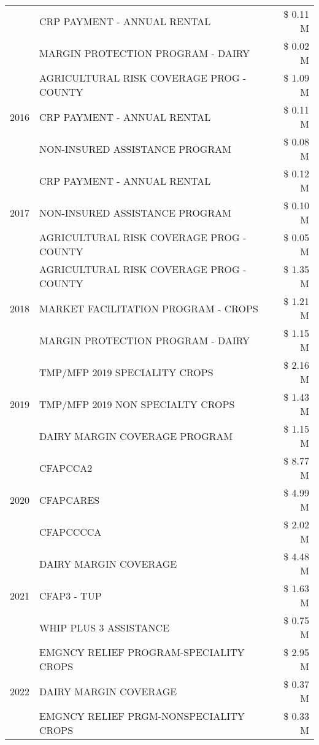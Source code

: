 \begin{tabular}{llr}
 & CRP PAYMENT - ANNUAL RENTAL & \$ 0.11 M \\
 & MARGIN PROTECTION PROGRAM - DAIRY & \$ 0.02 M \\
\cline{1-3}
\multirow[t]{3}{*}{2016} & AGRICULTURAL RISK COVERAGE PROG - COUNTY & \$ 1.09 M \\
 & CRP PAYMENT - ANNUAL RENTAL & \$ 0.11 M \\
 & NON-INSURED ASSISTANCE PROGRAM & \$ 0.08 M \\
\cline{1-3}
\multirow[t]{3}{*}{2017} & CRP PAYMENT - ANNUAL RENTAL & \$ 0.12 M \\
 & NON-INSURED ASSISTANCE PROGRAM & \$ 0.10 M \\
 & AGRICULTURAL RISK COVERAGE PROG - COUNTY & \$ 0.05 M \\
\cline{1-3}
\multirow[t]{3}{*}{2018} & AGRICULTURAL RISK COVERAGE PROG - COUNTY & \$ 1.35 M \\
 & MARKET FACILITATION PROGRAM - CROPS & \$ 1.21 M \\
 & MARGIN PROTECTION PROGRAM - DAIRY & \$ 1.15 M \\
\cline{1-3}
\multirow[t]{3}{*}{2019} & TMP/MFP 2019 SPECIALITY CROPS & \$ 2.16 M \\
 & TMP/MFP 2019 NON SPECIALTY CROPS & \$ 1.43 M \\
 & DAIRY MARGIN COVERAGE PROGRAM & \$ 1.15 M \\
\cline{1-3}
\multirow[t]{3}{*}{2020} & CFAPCCA2 & \$ 8.77 M \\
 & CFAPCARES & \$ 4.99 M \\
 & CFAPCCCCA & \$ 2.02 M \\
\cline{1-3}
\multirow[t]{3}{*}{2021} & DAIRY MARGIN COVERAGE & \$ 4.48 M \\
 & CFAP3 - TUP & \$ 1.63 M \\
 & WHIP PLUS 3 ASSISTANCE & \$ 0.75 M \\
\cline{1-3}
\multirow[t]{3}{*}{2022} & EMGNCY RELIEF PROGRAM-SPECIALITY CROPS & \$ 2.95 M \\
 & DAIRY MARGIN COVERAGE & \$ 0.37 M \\
 & EMGNCY RELIEF PRGM-NONSPECIALITY CROPS & \$ 0.33 M \\
\cline{1-3}
\bottomrule
\end{tabular}
